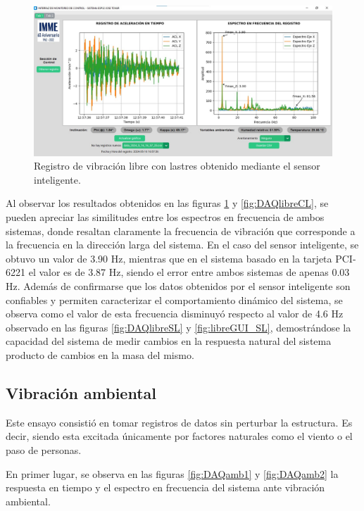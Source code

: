 \begin{figure}[H]
    \centering
    \includegraphics[width = \textwidth]{imagenes/cap3_resultados/Ensayos/VibLibreLastresSMARTSENSOR.jpg}
    \caption{Registro de vibración libre con lastres obtenido mediante el sensor inteligente.}
    \label{fig:libreGUI_CL}
\end{figure}

Al observar los resultados obtenidos en las figuras \ref{fig:libreGUI_CL} y \ref{fig:DAQlibreCL}, se pueden apreciar las similitudes entre los espectros en frecuencia de ambos sistemas, donde resaltan claramente la frecuencia de vibración que corresponde a la frecuencia en la dirección larga del sistema. En el caso del sensor inteligente, se obtuvo un valor de 3.90 Hz, mientras que en el sistema basado en la tarjeta PCI-6221 el valor es de 3.87 Hz, siendo el error entre ambos sistemas de apenas 0.03 Hz. Además de confirmarse que los datos obtenidos por el sensor inteligente son confiables y permiten caracterizar el comportamiento dinámico del sistema, se observa como el valor de esta frecuencia disminuyó respecto al valor de 4.6 Hz observado en las figuras \ref{fig:DAQlibreSL} y \ref{fig:libreGUI_SL}, demostrándose la capacidad del sistema de medir cambios en la respuesta natural del sistema producto de cambios en la masa del mismo.

\subsection{Vibración ambiental}

Este ensayo consistió en tomar registros de datos sin perturbar la estructura. Es decir, siendo esta excitada únicamente por factores naturales como el viento o el paso de personas.

En primer lugar, se observa en las figuras \ref{fig:DAQamb1} y \ref{fig:DAQamb2} la respuesta en tiempo y el espectro en frecuencia del sistema ante vibración ambiental.

